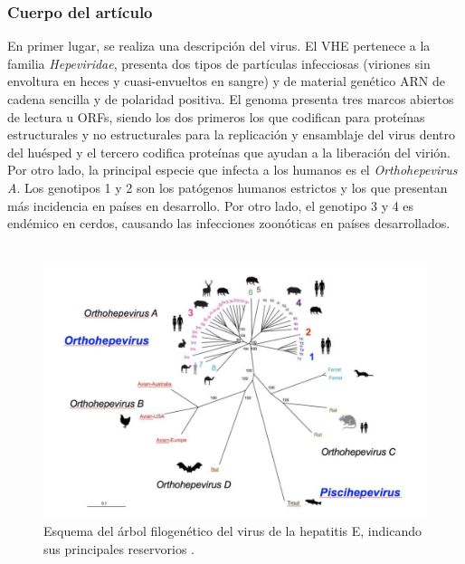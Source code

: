 \documentclass[11 pt]{article}
\begin{document}
\subsubsection{Cuerpo del artículo}
En primer lugar, se realiza una descripción del virus. El VHE pertenece a la familia {\em Hepeviridae}, presenta dos tipos de partículas infecciosas (viriones sin envoltura en heces y cuasi-envueltos en sangre) y de material genético ARN de cadena sencilla y de polaridad positiva. El genoma presenta tres marcos abiertos de lectura u ORFs, siendo los dos primeros los que codifican para proteínas estructurales y no estructurales para la replicación y ensamblaje del virus dentro del huésped y el tercero codifica proteínas que ayudan a la liberación del virión. Por otro lado, la principal especie que infecta a los humanos es el {\em Orthohepevirus A}. Los genotipos 1 y 2 son los patógenos humanos estrictos y los que presentan más incidencia en países en desarrollo. Por otro lado, el genotipo 3 y 4 es endémico en cerdos, causando las infecciones zoonóticas en países desarrollados.\\\\
\begin{figure} [h!] 
	\centering
	\includegraphics[width=0.5\linewidth]{imagenes/arbolfilogenetico.png}
	\caption[loftitle]{Esquema del árbol filogenético del virus de la hepatitis E, indicando sus principales reservorios \cite{Larrue2020}.} 
	\label{larrueimagen}
\end{figure}
\end{document}
